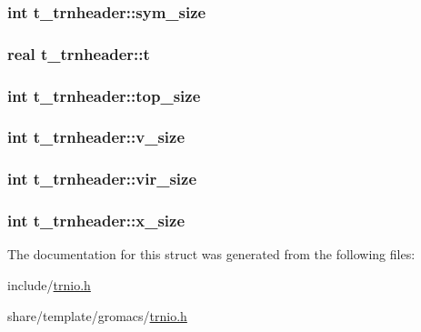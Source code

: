 \hypertarget{structt__trnheader_a9cebe2610b197f714325c695f075a9bf}{
\subsubsection[{sym\-\_\-size}]{\setlength{\rightskip}{0pt plus 5cm}int {\bf t\-\_\-trnheader\-::sym\-\_\-size}}}\label{structt__trnheader_a9cebe2610b197f714325c695f075a9bf}
\hypertarget{structt__trnheader_a5562cb096541c03b7b3255a51bcec323}{
\subsubsection[{t}]{\setlength{\rightskip}{0pt plus 5cm}real {\bf t\-\_\-trnheader\-::t}}}\label{structt__trnheader_a5562cb096541c03b7b3255a51bcec323}
\hypertarget{structt__trnheader_a991fab92fa4f91584426544a33562899}{
\subsubsection[{top\-\_\-size}]{\setlength{\rightskip}{0pt plus 5cm}int {\bf t\-\_\-trnheader\-::top\-\_\-size}}}\label{structt__trnheader_a991fab92fa4f91584426544a33562899}
\hypertarget{structt__trnheader_a9f82d15708b9c392dea5aa0ed59419cc}{
\subsubsection[{v\-\_\-size}]{\setlength{\rightskip}{0pt plus 5cm}int {\bf t\-\_\-trnheader\-::v\-\_\-size}}}\label{structt__trnheader_a9f82d15708b9c392dea5aa0ed59419cc}
\hypertarget{structt__trnheader_a784c4f2af9b4b38ad62e22eedaf6074f}{
\subsubsection[{vir\-\_\-size}]{\setlength{\rightskip}{0pt plus 5cm}int {\bf t\-\_\-trnheader\-::vir\-\_\-size}}}\label{structt__trnheader_a784c4f2af9b4b38ad62e22eedaf6074f}
\hypertarget{structt__trnheader_ae2ebfead30e41db0c308c9ffd19e5aca}{
\subsubsection[{x\-\_\-size}]{\setlength{\rightskip}{0pt plus 5cm}int {\bf t\-\_\-trnheader\-::x\-\_\-size}}}\label{structt__trnheader_ae2ebfead30e41db0c308c9ffd19e5aca}


\-The documentation for this struct was generated from the following files\-:\begin{DoxyCompactItemize}
\item 
include/\hyperlink{include_2trnio_8h}{trnio.\-h}\item 
share/template/gromacs/\hyperlink{share_2template_2gromacs_2trnio_8h}{trnio.\-h}\end{DoxyCompactItemize}
